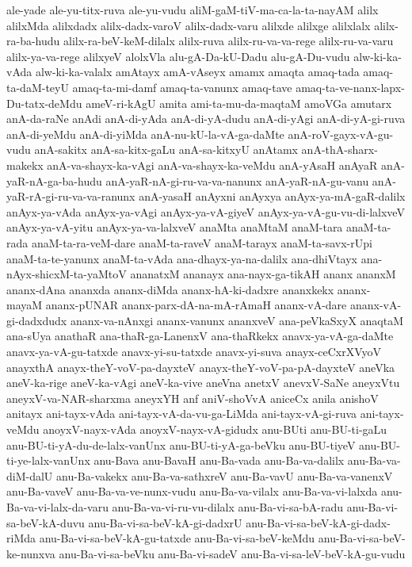 {ale-yade
ale-yu-titx-ruva
ale-yu-vudu
aliM-gaM-tiV-ma-ca-la-ta-nayAM
alilx
alilxMda
alilxdadx
alilx-dadx-varoV
alilx-dadx-varu
alilxde
alilxge
alilxlalx
alilx-ra-ba-hudu
alilx-ra-beV-keM-dilalx
alilx-ruva
alilx-ru-va-va-rege
alilx-ru-va-varu
alilx-ya-va-rege
alilxyeV
alolxVla
alu-gA-Da-kU-Dadu
alu-gA-Du-vudu
alw-ki-ka-vAda
alw-ki-ka-valalx
amAtayx
amA-vAseyx
amamx
amaqta
amaq-tada
amaq-ta-daM-teyU
amaq-ta-mi-damf
amaq-ta-vanunx
amaq-tave
amaq-ta-ve-nanx-lapx-Du-tatx-deMdu
ameV-ri-kAgU
amita
ami-ta-mu-da-maqtaM
amoVGa
amutarx
anA-da-raNe
anAdi
anA-di-yAda
anA-di-yA-dudu
anA-di-yAgi
anA-di-yA-gi-ruva
anA-di-yeMdu
anA-di-yiMda
anA-nu-kU-la-vA-ga-daMte
anA-roV-gayx-vA-gu-vudu
anA-sakitx
anA-sa-kitx-gaLu
anA-sa-kitxyU
anAtamx
anA-thA-sharx-makekx
anA-va-shayx-ka-vAgi
anA-va-shayx-ka-veMdu
anA-yAsaH
anAyaR
anA-yaR-nA-ga-ba-hudu
anA-yaR-nA-gi-ru-va-va-nanunx
anA-yaR-nA-gu-vanu
anA-yaR-rA-gi-ru-va-va-ranunx
anA-yasaH
anAyxni
anAyxya
anAyx-ya-mA-gaR-dalilx
anAyx-ya-vAda
anAyx-ya-vAgi
anAyx-ya-vA-giyeV
anAyx-ya-vA-gu-vu-di-lalxveV
anAyx-ya-vA-yitu
anAyx-ya-va-lalxveV
anaMta
anaMtaM
anaM-tara
anaM-ta-rada
anaM-ta-ra-veM-dare
anaM-ta-raveV
anaM-tarayx
anaM-ta-savx-rUpi
anaM-ta-te-yanunx
anaM-ta-vAda
ana-dhayx-ya-na-dalilx
ana-dhiVtayx
ana-nAyx-shicxM-ta-yaMtoV
ananatxM
ananayx
ana-nayx-ga-tikAH
ananx
ananxM
ananx-dAna
ananxda
ananx-diMda
ananx-hA-ki-dadxre
ananxkekx
ananx-mayaM
ananx-pUNAR
ananx-parx-dA-na-mA-rAmaH
ananx-vA-dare
ananx-vA-gi-dadxdudx
ananx-va-nAnxgi
ananx-vanunx
ananxveV
ana-peVkaSxyX
anaqtaM
ana-sUya
anathaR
ana-thaR-ga-LanenxV
ana-thaRkekx
anavx-ya-vA-ga-daMte
anavx-ya-vA-gu-tatxde
anavx-yi-su-tatxde
anavx-yi-suva
anayx-ceCxrXVyoV
anayxthA
anayx-theY-voV-pa-dayxteV
anayx-theY-voV-pa-pA-dayxteV
aneVka
aneV-ka-rige
aneV-ka-vAgi
aneV-ka-vive
aneVna
anetxV
anevxV-SaNe
aneyxVtu
aneyxV-va-NAR-sharxma
aneyxYH
anf
aniV-shoVvA
aniceCx
anila
anishoV
anitayx
ani-tayx-vAda
ani-tayx-vA-da-vu-ga-LiMda
ani-tayx-vA-gi-ruva
ani-tayx-veMdu
anoyxV-nayx-vAda
anoyxV-nayx-vA-gidudx
anu-BUti
anu-BU-ti-gaLu
anu-BU-ti-yA-du-de-lalx-vanUnx
anu-BU-ti-yA-ga-beVku
anu-BU-tiyeV
anu-BU-ti-ye-lalx-vanUnx
anu-Bava
anu-BavaH
anu-Ba-vada
anu-Ba-va-dalilx
anu-Ba-va-diM-dalU
anu-Ba-vakekx
anu-Ba-va-sathxreV
anu-Ba-vavU
anu-Ba-va-vanenxV
anu-Ba-vaveV
anu-Ba-va-ve-nunx-vudu
anu-Ba-va-vilalx
anu-Ba-va-vi-lalxda
anu-Ba-va-vi-lalx-da-varu
anu-Ba-va-vi-ru-vu-dilalx
anu-Ba-vi-sa-bA-radu
anu-Ba-vi-sa-beV-kA-duvu
anu-Ba-vi-sa-beV-kA-gi-dadxrU
anu-Ba-vi-sa-beV-kA-gi-dadx-riMda
anu-Ba-vi-sa-beV-kA-gu-tatxde
anu-Ba-vi-sa-beV-keMdu
anu-Ba-vi-sa-beV-ke-nunxva
anu-Ba-vi-sa-beVku
anu-Ba-vi-sadeV
anu-Ba-vi-sa-leV-beV-kA-gu-vudu
}
